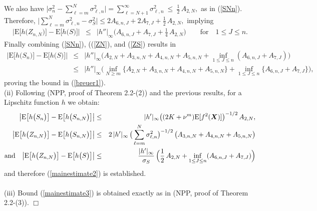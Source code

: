 \documentclass[10pt]{article}
\def\E{\mathrm E}
\def\text{\mbox}
\newcommand{\mbf}[1]{\mbox{\boldmath $#1$}}
\begin{document}
We also have  %
$\big |\sigma^2_{n}  -  \sum_{\ell = m}^N \sigma^2_{\ell,n} \big|
= \sum_{\ell = N+1}^\infty \sigma^2_{\ell,n} \ \le \  \frac 1 2 \,  A_{2,N}, $ as in (\ref{SNn}).
Therefore,  $\Big| \sum_{\ell=m}^N \sigma^2_{\ell,n} -\sigma_S^2\Big|
\le 2 A_{6,n,J}   + 2 A_{7,J} + \frac 1 2 \,  A_{2,N}, $ implying
\begin{eqnarray}
\Big| \E \big [h\big ( Z_{n,N} \big) \big ]-\E \big [h\big ( S\big) \big ] \Big|
&\leq &|h''|_\infty \Big(A_{6,n,J}   + A_{7,J} + \frac 1 4 \,  A_{2,N}  \Big) \qquad \text{for} \quad 1\le J \le n.
\label{ZS}
\end{eqnarray}
Finally combining (\ref{SNn}), ((\ref{ZN}), and (\ref{ZS}) results in
\begin{eqnarray*}
\Big |\E \big [ h\big (S_n \big)\big ] -\E \big [ h\big ( S\big ) \big ] \Big | &\leq &|h''|_\infty
\Big(A_{2,N} +  A_{3,n,N} + A_{4,n,N} + A_{5,n,N} + \inf_{1\le J \le n}(A_{6,n,J}   + A_{7,J})\Big) \\
&\leq &|h''|_\infty
\Big(\inf_{N \ge m} \big\{ A_{2,N} +  A_{3,n,N} + A_{4,n,N} + A_{5,n,N}\big\}   +
\inf_{1 \le J \le n} \big\{ A_{6,n,J} + A_{7,J}\big\}\Big),
\end{eqnarray*}
proving the bound in (\ref{breuer1}).   ~\\















\noindent (ii) Following (NPP, proof of Theorem 2.2-(2)) and the previous results, for a Lipschitz function $h$  we obtain:
\begin{eqnarray*}\label{SNn2}
\big | \E \big [h\big ( S_n\big) \big ]-\E \big [h\big ( S_{n,N}\big) \big ] \big |&\leq &|h'|_{\infty} \big(  (2K+\nu^m)\E[f^2({\mbf X})] \big )^{-1/2}  \, A_{2,N},\\
\big | \E \big [h\big ( Z_{n,N} \big) \big ]-\E \big [h\big ( S_{n,N}\big) \big ] \big |
\label{ZN2} &\leq &2 \,  |h'|_\infty \,\big ( \sum_{\ell=m}^N \sigma_{\ell,n}^2 \big )^{-1/2} \,  \big(A_{3,n,N}+  A_{4,n,N}+A_{5,n,N}\big)\\
\mbox{and}\quad \big | \E \big [h\big ( Z_{n,N} \big) \big ]-\E \big [h\big ( S\big) \big ] \big |& \leq &
\frac {|h'|_\infty}{\sigma_S}\,  \Big ( \frac 1 2 \,  A_{2,N}+ \inf_{1\le J \le n}(A_{6,n,J}+A_{7,J}) \Big )
\end{eqnarray*}
and therefore (\ref{mainestimate2}) is established. \\
~\\
(iii) Bound  (\ref{mainestimate3}) is obtained exactly as in  (NPP, proof of Theorem 2.2-(3)).  \hfill $\Box $ \\
\end{document}
